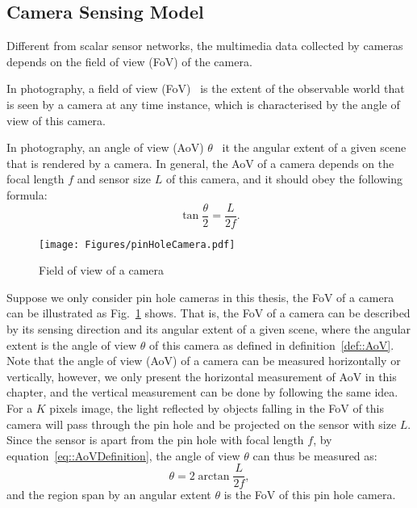 \subsection{Camera Sensing Model}
Different from scalar sensor networks, the multimedia data collected by cameras depends on the field of view (FoV) of the camera.
\begin{mydef}
In photography, a field of view (FoV)~\cite{szeliski2010computer} is the extent of the observable world that is seen by a camera at any time instance, which is characterised by the angle of view of this camera.
\label{def::FoV}
\end{mydef}
\begin{mydef}
In photography, an angle of view (AoV) $\theta$~\cite{szeliski2010computer} it the angular extent of a given scene that is rendered by a camera.
In general, the AoV of a camera depends on the focal length $f$ and sensor size $L$ of this camera, and it should obey the following formula:
\begin{equation}
\tan \frac{\theta}{2} = \frac{L}{2f}.
\label{eq::AoVDefinition}
\end{equation}
\label{def::AoV}
\end{mydef}
%
\begin{figure}
\begin{center}
\texttt{[image: Figures/pinHoleCamera.pdf]}
\caption{\label{fig::fov}Field of view of a camera}
\end{center}
\end{figure}
%
Suppose we only consider pin hole cameras in this thesis, the FoV of a camera can be illustrated as Fig.~\ref{fig::fov} shows.
That is, the FoV of a camera can be described by its sensing direction and its angular extent of a given scene, where the angular extent is the angle of view $\theta$ of this camera as defined in definition~\ref{def::AoV}.
Note that the angle of view (AoV) of a camera can be measured horizontally or vertically, however, we only present the horizontal measurement of AoV in this chapter, and the vertical measurement can be done by following the same idea.
For a $K$ pixels image, the light reflected by objects falling in the FoV of this camera will pass through the pin hole and be projected on the sensor with size $L$.
Since the sensor is apart from the pin hole with focal length $f$, by equation~\eqref{eq::AoVDefinition}, the angle of view $\theta$ can thus be measured as:
\begin{equation}
\theta = 2 \arctan \frac{L}{2f},
\label{eq::AoV}
\end{equation}
and the region span by an angular extent $\theta$ is the FoV of this pin hole camera.
%
